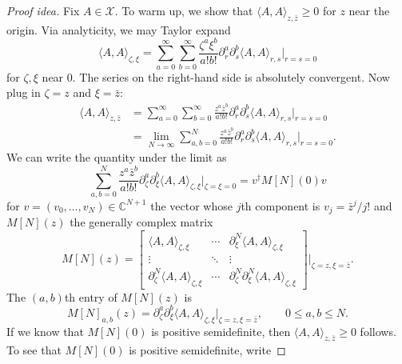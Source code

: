 \documentclass[11pt, letterpaper, reqno]{amsart}
\theoremstyle{definition}
\theoremstyle{remark}
\newcommand{\bbC}{\mathbb{C}}
\newcommand{\calX}{\mathcal{X}}
\begin{document}
\begin{proof}[Proof idea]
Fix $A\in\calX$.
To warm up, we show that $\langle A,A\rangle_{z,\bar z}\geq0$
for $z$ near the origin. Via analyticity, we may Taylor expand
\begin{equation}
 \langle A,A\rangle_{\zeta,\xi}
 =\sum_{a=0}^\infty\sum_{b=0}^\infty
 \frac{\zeta^a\xi^b}{a!b!}
 \partial_r^a\partial_s^b\langle A,A\rangle_{r,s}
 \Big|_{r=s=0}
\end{equation}
for $\zeta,\xi$ near $0$. The series on the right-hand side is
absolutely convergent. Now plug in $\zeta=z$ and $\xi=\bar z$:
\begin{equation}
\begin{split}
 \langle A,A\rangle_{z,\bar z}
 &=\sum_{a=0}^\infty\sum_{b=0}^\infty
 \frac{z^a\bar z^b}{a!b!}
 \partial_r^a\partial_s^b\langle A,A\rangle_{r,s}
 \Big|_{r=s=0}\\
 &=\lim_{N\to\infty}\sum_{a,b=0}^N
 \frac{z^a\bar z^b}{a!b!}
 \partial_r^a\partial_s^b\langle A,A\rangle_{r,s}
 \Big|_{r=s=0}.
\end{split}
\end{equation}
We can write the quantity under the limit as
\begin{equation}
 \sum_{a,b=0}^N\frac{z^a\bar z^b}{a!b!}
 \partial_\zeta^a\partial_\xi^b
 \langle A,A\rangle_{\zeta,\xi}\Big|_{\zeta=\xi=0}
 =v^\dagger M[N](0)v
\end{equation}
for $v=(v_0,\dots,v_N)\in\bbC^{N+1}$ the vector whose $j$th
component is $v_j=\bar z^j/j!$ and $M[N](z)$ the generally complex
matrix
\begin{equation}
 M[N](z)=
 \begin{bmatrix}
 \langle A,A\rangle_{\zeta,\xi}&\cdots&
   \partial_\xi^N\langle A,A\rangle_{\zeta,\xi}\\
 \vdots&\ddots&\vdots\\
 \partial_\zeta^N\langle A,A\rangle_{\zeta,\xi}&\cdots&
   \partial_\zeta^N\partial_\xi^N\langle A,A\rangle_{\zeta,\xi}
 \end{bmatrix}\Bigg|_{\zeta=z,\xi=\bar z}.
\end{equation}
The $(a,b)$th entry of $M[N](z)$ is
\begin{equation}\label{eq:reflection-derivative-matrices}
 M[N]_{a,b}(z)=\partial_\zeta^a\partial_\xi^b
 \langle A,A\rangle_{\zeta,\xi}\Big|_{\zeta=z,\xi=\bar z},
 \qquad0\leq a,b\leq N.
\end{equation}
If we know that $M[N](0)$ is positive semidefinite, then
$\langle A,A\rangle_{z,\bar z}\geq0$ follows.
To see that $M[N](0)$ is positive semidefinite, write

\end{proof}
\end{document}
